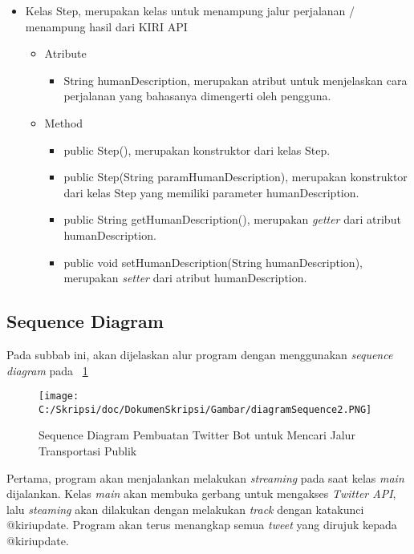 \begin{itemize}
		\item Kelas Step, merupakan kelas untuk menampung jalur perjalanan / menampung hasil dari KIRI API
		
		
				\begin{itemize}
							\item Atribute
					
					
									\begin{itemize}
												\item String humanDescription, merupakan atribut untuk menjelaskan cara perjalanan yang bahasanya dimengerti oleh pengguna.
									\end{itemize}
					
							\item Method
					
					
									\begin{itemize}
												\item public Step(), merupakan konstruktor dari kelas Step.
												\item public Step(String paramHumanDescription), merupakan konstruktor dari kelas Step yang memiliki parameter humanDescription.
												\item public String getHumanDescription(), merupakan \textit{getter} dari atribut humanDescription.
												\item public void setHumanDescription(String humanDescription), merupakan \textit{setter} dari atribut humanDescription.
									\end{itemize}
				\end{itemize}
\end{itemize}




\subsection{Sequence Diagram}

Pada subbab ini, akan dijelaskan alur program dengan menggunakan \textit{sequence diagram} pada ~\ref{fig:diagramSequence2}

\begin{figure}[htbp]
	\centering
		\texttt{[image: C:/Skripsi/doc/DokumenSkripsi/Gambar/diagramSequence2.PNG]}
	\caption{Sequence Diagram Pembuatan Twitter Bot untuk Mencari Jalur Transportasi Publik}
	\label{fig:diagramSequence2}
\end{figure}


Pertama, program akan menjalankan melakukan \textit{streaming} pada saat kelas \textit{main} dijalankan. Kelas \textit{main} akan membuka gerbang untuk mengakses \textit{Twitter API}, lalu \textit{steaming} akan dilakukan dengan melakukan \textit{track} dengan katakunci @kiriupdate. Program akan terus menangkap semua \textit{tweet} yang dirujuk kepada @kiriupdate.


